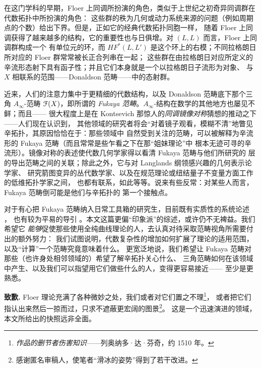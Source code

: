 \documentclass[11pt,a4paper]{article}
\numberwithin{equation}{section}
\newcommand{\scrF}{\EuScript{F}}
\begin{document}
在这门学科的早期，Floer 上同调所扮演的角色，类似于上世纪之初奇异同调群在代数拓扑中所扮演的角色：
这些群的秩为几何或动力系统来源的问题（例如周期点的个数）给出下界。但是，正如它的经典代数拓扑同胞一样，
随着 Floer 上同调获得了越来越多的结构，它的重要性也与日俱增。对 $(L,L)$ 而言，Floer 上同调群构成一个
有单位元的环，而 $HF^*(L,L')$ 是这个环上的右模；不同拉格朗日所对应的 Floer 群常常被长正合列串在一起；
这些群在由拉格朗日对应所定义的辛流形态射下具有函子性；并且它们本身就是一个以拉格朗日子流形为对象、
与 $X$ 相联系的范围——Donaldson 范畴——中的态射群。


近来，人们的注意力集中于更精细的代数结构，以及 Donaldson 范畴底下那个三角 $A_\infty$-范畴
$\scrF(X)$，即所谓的 \emph{Fukaya 范畴}。$A_\infty$-结构在数学的其他地方也屡见不鲜；而且——
很大程度上是在 Kontsevich 那惊人的\emph{同调镜像对称}猜想的推动之下——人们现在认识到，
其他领域的研究者将会“对着镜子观看，模糊不清”地瞥见辛拓扑，其原因恰恰在于：那些领域中
自然受到关注的范畴，可以被解释为辛流形的 Fukaya 范畴（而且常常是些乍看之下在那“姐妹理论”中
根本无迹可寻的辛流形）。镜像对称的表述使代数几何学家得以看清 Fukaya 范畴与他们所研究的
层的导出范畴之间的关联；除此之外，它与对 Langlands 纲领感兴趣的几何表示论学家、
研究箭图变异的丛代数学家、以及在规范理论或纽结量子不变量方面工作的低维拓扑学家之间，
也都有联系，如此等等。说来有些反常：对某些人而言，Fukaya 范畴倒可能是他们与辛拓扑的
第一个接触点。


对于有心把 Fukaya 范畴纳入日常工具箱的研究生，目前既有实质性的系统论述 \cite{FO3, FCPLT}，
也有较为平易的导引 \cite{Auroux}。本文这篇更偏“印象派”的综述，或许仍不无裨益。我们希望它
\emph{能够}促使那些使用全纯曲线理论的人，去认真对待采取范畴视角所需要付出的额外努力：
我们试图说明，代数复杂性的增加如何扩展了理论的适用范围，以及“计算”一个范畴究竟意味着什么。
更宽泛地说，我们希望让 Fukaya 范畴对那些（也许身处相邻领域的）希望了解辛拓扑关心什么、
三角范畴如何在该领域中产生、以及我们可以指望用它们做些什么的人，变得更容易接近——
至少是更熟悉。

\noindent\textbf{致歉.} Floer 理论充满了各种微妙之处，我们或者对它们置之不理\footnote{%
\emph{作品的删节者伤害知识}——列奥纳多·达·芬奇，约 1510 年。}，
或者把它们指认出来然后一掠而过，只求不遮蔽更宏阔的图景\footnote{%
感谢匿名审稿人，使笔者“滑冰的姿势”得到了若干改进。}。
这是一个迅速演进的领域，本文所给出的快照远非全面。
\end{document}
